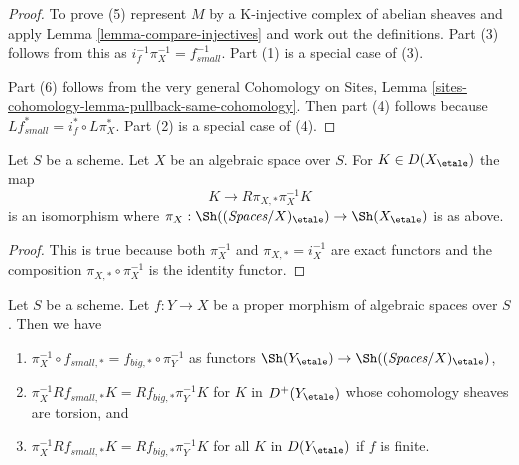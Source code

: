 \begin{proof}
To prove (5) represent $M$ by a K-injective complex of abelian sheaves
and apply Lemma \ref{lemma-compare-injectives}
and work out the definitions. Part (3) follows from
this as $i_f^{-1}\pi_X^{-1} = f_{small}^{-1}$. Part (1) is a special
case of (3).

\medskip\noindent
Part (6) follows from the very general Cohomology on Sites, Lemma
\ref{sites-cohomology-lemma-pullback-same-cohomology}. Then part
(4) follows because $Lf_{small}^* = i_f^* \circ L\pi_X^*$.
Part (2) is a special case of (4).
\end{proof}

\begin{lemma}
\label{lemma-cohomological-descent-etale}
Let $S$ be a scheme. Let $X$ be an algebraic space over $S$.
For $K \in D(X_\etale)$ the map
$$
K \longrightarrow R\pi_{X, *}\pi_X^{-1}K
$$
is an isomorphism where
$\pi_X : \Sh((\textit{Spaces}/X)_\etale) \to \Sh(X_\etale)$ is as above.
\end{lemma}

\begin{proof}
This is true because both $\pi_X^{-1}$ and $\pi_{X, *} = i_X^{-1}$
are exact functors and the composition $\pi_{X, *} \circ \pi_X^{-1}$
is the identity functor.
\end{proof}

\begin{lemma}
\label{lemma-compare-higher-direct-image-proper}
Let $S$ be a scheme.
Let $f : Y \to X$ be a proper morphism of algebraic spaces over $S$.
Then we have
\begin{enumerate}
\item $\pi_X^{-1} \circ f_{small, *} = f_{big, *} \circ \pi_Y^{-1}$
as functors $\Sh(Y_\etale) \to \Sh((\textit{Spaces}/X)_\etale)$,
\item $\pi_X^{-1}Rf_{small, *}K = Rf_{big, *}\pi_Y^{-1}K$
for $K$ in $D^+(Y_\etale)$ whose cohomology sheaves are torsion, and
\item $\pi_X^{-1}Rf_{small, *}K = Rf_{big, *}\pi_Y^{-1}K$
for all $K$ in $D(Y_\etale)$ if $f$ is finite.
\end{enumerate}
\end{lemma}


